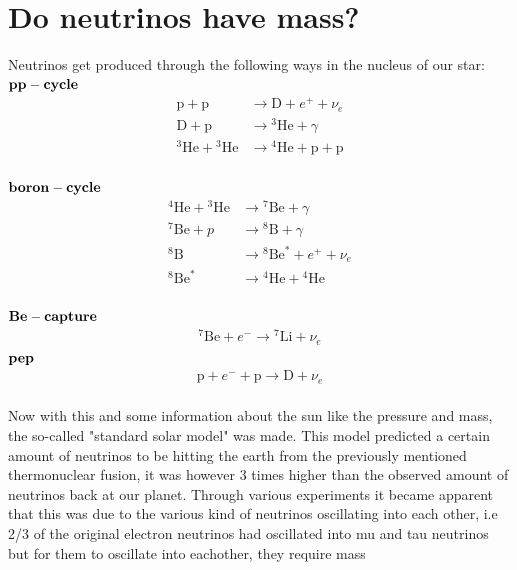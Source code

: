 \documentclass[11pt,a4paper,faculty=we,language=en,doctype=report]{cls/ugent-doc}
\begin{document}
\section{Do neutrinos have mass?}
Neutrinos get produced through the following ways in the nucleus of our star:\\
$\bold{pp-cycle}$
\begin{align}
	\mathrm{p} + \mathrm{p} &\rightarrow \mathrm{D} + e^+ + \nu_e\\
	\mathrm{D} + \mathrm{p} &\rightarrow {}^3\mathrm{He} + \gamma\\
	{}^3\mathrm{He} + {}^3\mathrm{He} &\rightarrow {}^4\mathrm{He} + \mathrm{p} + \mathrm{p}
\end{align}\\
$\bold{boron-cycle}$
\begin{align}
{ }^4 \mathrm{He}+{ }^3 \mathrm{He} & \rightarrow{ }^7 \mathrm{Be}+\gamma \\
{ }^7 \mathrm{Be}+p & \rightarrow { }^8\mathrm{B} + \gamma \\
{ }^8 \mathrm{B} & \rightarrow{ }^8 \mathrm{Be}^*+e^{+}+\nu_e \\
{ }^8 \mathrm{Be}^* & \rightarrow{ }^4 \mathrm{He}+{ }^4 \mathrm{He}
\end{align}\\
$\bold{Be-capture}$
\begin{align}
	^7\mathrm{Be} + e^- \rightarrow {}^7\mathrm{Li} + \nu_e
\end{align}
$\bold{pep}$
\begin{align}
	\mathrm{p} + e^- + \mathrm{p} \rightarrow \mathrm{D} + \nu_e
\end{align}\\
Now with this and some information about the sun like the pressure and mass, 
the so-called "standard solar model" was
made. This model predicted a certain amount of neutrinos to be hitting the earth from the previously
mentioned thermonuclear fusion, it was however 3 times higher than the observed amount of neutrinos back
at our planet. Through various experiments it became apparent that this was due to the various kind of
neutrinos oscillating into each other, i.e 2/3 of the original electron 
neutrinos had oscillated into mu and tau neutrinos
but for them to oscillate into eachother, they require mass
\end{document}
